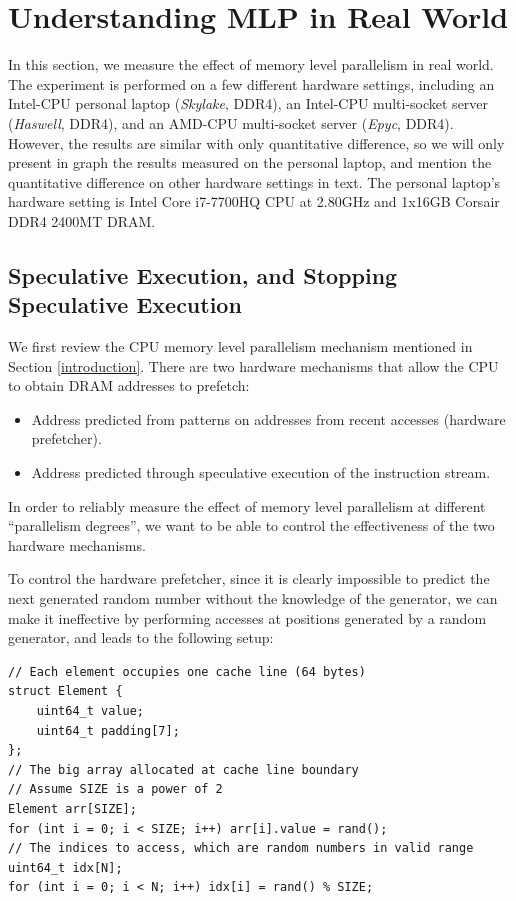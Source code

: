 \documentclass[11pt, usletter]{article}
\begin{document}
\section{Understanding MLP in Real World} \label{understandmlp}

In this section, we measure the effect of memory level parallelism in real world. 
The experiment is performed on a few different hardware settings, 
including an Intel-CPU personal laptop (\textit{Skylake}, DDR4), 
an Intel-CPU multi-socket server (\textit{Haswell}, DDR4), and an AMD-CPU multi-socket server (\textit{Epyc}, DDR4).
However, the results are similar with only quantitative difference, 
so we will only present in graph the results measured on the personal laptop, 
and mention the quantitative difference on other hardware settings in text.
The personal laptop's hardware setting is Intel Core i7-7700HQ CPU at 2.80GHz and 1x16GB Corsair DDR4 2400MT DRAM.
 
\subsection{Speculative Execution, and Stopping Speculative Execution} \label{specexec}
We first review the CPU memory level parallelism mechanism mentioned in Section \ref{introduction}.
There are two hardware mechanisms that allow the CPU to obtain DRAM addresses to prefetch:
\begin{itemize}
[topsep=0pt,partopsep=0pt,itemsep=0pt,parsep=0pt,fullwidth,itemindent=\parindent,listparindent=\parindent]
\item Address predicted from patterns on addresses from recent accesses (hardware prefetcher).
\item Address predicted through speculative execution of the instruction stream.
\end{itemize}
In order to reliably measure the effect of memory level parallelism at different ``parallelism degrees'', 
we want to be able to control the effectiveness of the two hardware mechanisms.

To control the hardware prefetcher, 
since it is clearly impossible to predict the next generated random number without the knowledge of the generator,
we can make it ineffective by performing accesses at positions generated by a random generator, 
and leads to the following setup:

\singlespacing\begin{codebox}
\begin{verbatim}
// Each element occupies one cache line (64 bytes)
struct Element {
    uint64_t value;
    uint64_t padding[7];
};	
// The big array allocated at cache line boundary
// Assume SIZE is a power of 2
Element arr[SIZE];
for (int i = 0; i < SIZE; i++) arr[i].value = rand();	
// The indices to access, which are random numbers in valid range
uint64_t idx[N];
for (int i = 0; i < N; i++) idx[i] = rand() % SIZE;
\end{verbatim}
\end{codebox}\doublespacing
\end{document}
